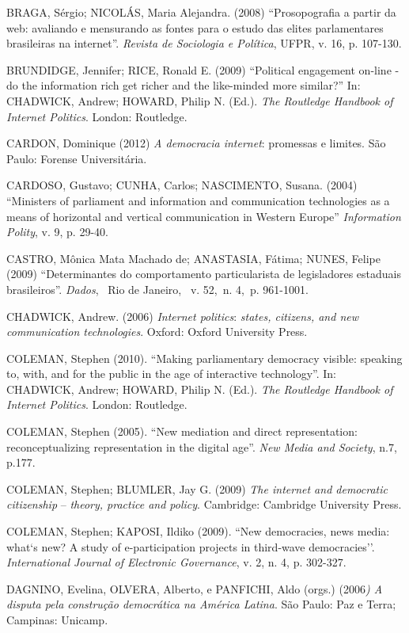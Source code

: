 BRAGA, Sérgio; NICOLÁS, Maria Alejandra. (2008) ``Prosopografia a partir
da web: avaliando e mensurando as fontes para o estudo das elites
parlamentares brasileiras na internet''. \emph{Revista de Sociologia e
Política}, UFPR, v. 16, p. 107-130.

BRUNDIDGE, Jennifer; RICE, Ronald E. (2009) ``Political engagement
on-line - do the information rich get richer and the like-minded more
similar?'' In: CHADWICK, Andrew; HOWARD, Philip N. (Ed.). \emph{The
Routledge Handbook of Internet Politics}. London: Routledge.

CARDON, Dominique (2012) \emph{A democracia internet}: promessas e
limites. São Paulo: Forense Universitária.

CARDOSO, Gustavo; CUNHA, Carlos; NASCIMENTO, Susana. (2004) ``Ministers
of parliament and information and communication technologies as a means
of horizontal and vertical communication in Western Europe''
\emph{Information Polity}, v. 9, p. 29-40.

CASTRO, Mônica Mata Machado de; ANASTASIA, Fátima; NUNES, Felipe (2009)
``Determinantes do comportamento particularista de legisladores
estaduais brasileiros''. \emph{Dados},~ Rio de Janeiro,~ v. 52,~n. 4,~p.
961-1001.

CHADWICK, Andrew. (2006) \emph{Internet politics}: \emph{states,
citizens, and new communication technologies}. Oxford: Oxford University
Press.

COLEMAN, Stephen (2010). ``Making parliamentary democracy visible:
speaking to, with, and for the public in the age of interactive
technology''. In: CHADWICK, Andrew; HOWARD, Philip N. (Ed.). \emph{The
Routledge Handbook of Internet Politics}. London: Routledge.

COLEMAN, Stephen (2005). ``New mediation and direct representation:
reconceptualizing representation in the digital age''. \emph{New Media
and Society}, n.7, p.177.

COLEMAN, Stephen; BLUMLER, Jay G. (2009) \emph{The internet and
democratic citizenship} -- \emph{theory, practice and policy}.
Cambridge: Cambridge University Press.

COLEMAN, Stephen; KAPOSI, Ildiko (2009). ``New democracies, news media:
what`s new? A study of e-participation projects in third-wave
democracies''. \emph{International Journal of Electronic Governance}, v.
2, n. 4, p. 302-327.

DAGNINO, Evelina, OLVERA, Alberto, e PANFICHI, Aldo (orgs.) (2006\emph{)
A disputa pela construção democrática na América Latina}. São Paulo: Paz
e Terra; Campinas: Unicamp.

